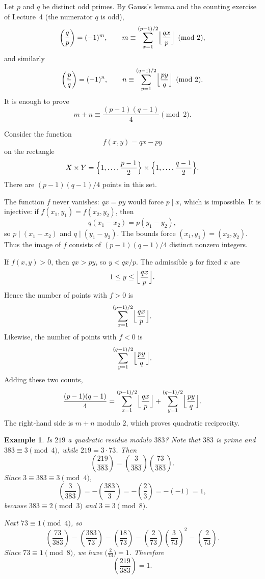 \documentclass[11pt]{article}
\newtheorem{example}[theorem]{Example}
\theoremstyle{remark}
\begin{document}
Let $p$ and $q$ be distinct odd primes. By Gauss's lemma and the counting
exercise of Lecture~4 (the numerator $q$ is odd),
\[
    \left(\frac qp\right)=(-1)^m,
    \qquad
    m\equiv\sum_{x=1}^{(p-1)/2}\Bigl\lfloor\frac{qx}{p}\Bigr\rfloor\pmod 2,
\]
and similarly
\[
    \left(\frac pq\right)=(-1)^n,
    \qquad
    n\equiv\sum_{y=1}^{(q-1)/2}\Bigl\lfloor\frac{py}{q}\Bigr\rfloor\pmod 2.
\]
It is enough to prove
\[
    m+n\equiv\frac{(p-1)(q-1)}{4}\pmod 2.
\]

Consider the function
\[
    f(x,y)=qx-py
\]
on the rectangle
\[
    X\times Y
    =
    \Bigl\{1,\ldots,\frac{p-1}{2}\Bigr\}
    \times
    \Bigl\{1,\ldots,\frac{q-1}{2}\Bigr\}.
\]
There are $(p-1)(q-1)/4$ points in this set.

The function $f$ never vanishes: $qx=py$ would force $p\mid x$, which is
impossible. It is injective: if $f(x_1,y_1)=f(x_2,y_2)$, then
\[
    q(x_1-x_2)=p(y_1-y_2),
\]
so $p\mid(x_1-x_2)$ and $q\mid(y_1-y_2)$. The bounds force
$(x_1,y_1)=(x_2,y_2)$. Thus the image of $f$ consists of
$(p-1)(q-1)/4$ distinct nonzero integers.

If $f(x,y)>0$, then $qx>py$, so $y<qx/p$. The admissible $y$ for fixed $x$
are
\[
    1\le y\le\Bigl\lfloor\frac{qx}{p}\Bigr\rfloor.
\]
Hence the number of points with $f>0$ is
\[
    \sum_{x=1}^{(p-1)/2}\Bigl\lfloor\frac{qx}{p}\Bigr\rfloor.
\]
Likewise, the number of points with $f<0$ is
\[
    \sum_{y=1}^{(q-1)/2}\Bigl\lfloor\frac{py}{q}\Bigr\rfloor.
\]
Adding these two counts,
\[
    \frac{(p-1)(q-1)}{4}
    =
    \sum_{x=1}^{(p-1)/2}\Bigl\lfloor\frac{qx}{p}\Bigr\rfloor
    +
    \sum_{y=1}^{(q-1)/2}\Bigl\lfloor\frac{py}{q}\Bigr\rfloor.
\]
The right-hand side is $m+n$ modulo $2$, which proves quadratic reciprocity.

\begin{example}
Is $219$ a quadratic residue modulo $383$? Note that $383$ is prime and
$383\equiv 3\pmod 4$, while $219=3\cdot 73$. Then
\[
    \left(\frac{219}{383}\right)
    =
    \left(\frac{3}{383}\right)
    \left(\frac{73}{383}\right).
\]
Since $3\equiv 383\equiv 3\pmod 4$,
\[
    \left(\frac{3}{383}\right)
    =
    -\left(\frac{383}{3}\right)
    =
    -\left(\frac{2}{3}\right)
    =
    -(-1)
    =1,
\]
because $383\equiv 2\pmod 3$ and $3\equiv 3\pmod 8$.

Next $73\equiv 1\pmod 4$, so
\[
    \left(\frac{73}{383}\right)
    =
    \left(\frac{383}{73}\right)
    =
    \left(\frac{18}{73}\right)
    =
    \left(\frac{2}{73}\right)
    \left(\frac{3}{73}\right)^2
    =
    \left(\frac{2}{73}\right).
\]
Since $73\equiv 1\pmod 8$, we have $\bigl(\frac{2}{73}\bigr)=1$. Therefore
\[
    \left(\frac{219}{383}\right)=1.
\]
\end{example}
\end{document}
